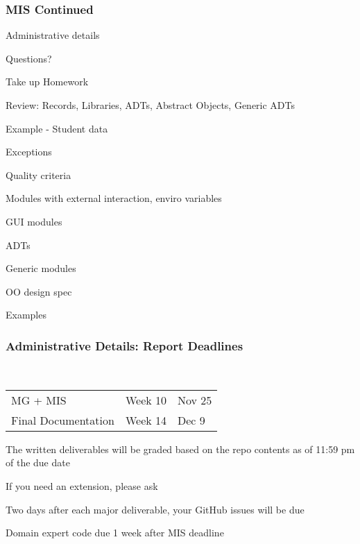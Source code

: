 \documentclass[t,12pt,numbers,fleqn,handout]{beamer}
\begin{document}



\begin{frame}
\frametitle{MIS Continued}

\bi
\item Administrative details
\item Questions?
\item Take up Homework
\item Review: Records, Libraries, ADTs, Abstract Objects, Generic ADTs
\item Example - Student data
\item Exceptions
\item Quality criteria
\item Modules with external interaction, enviro variables
\item GUI modules
\item ADTs
\item Generic modules
\item OO design spec
\item Examples
\ei
\end{frame}





\begin{frame}
\frametitle{Administrative Details: Report Deadlines}
~\newline
\begin{tabular}{l l l}
MG + MIS & Week 10 & Nov 25\\
Final Documentation & Week 14 & Dec 9\\
\end {tabular}

\bi
\item The written deliverables will be graded based on the repo contents as of
11:59 pm of the due date
\item If you need an extension, please ask
\item Two days after each major deliverable, your GitHub issues will be due
\item Domain expert code due 1 week after MIS deadline
\ei

\end{frame}
\end{document}
